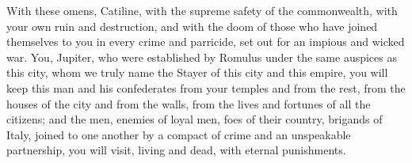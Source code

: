  With these omens, Catiline, with the supreme safety of the commonwealth, with your own ruin and destruction, and with the doom of those who have joined themselves to you in every crime and parricide, set out for an impious and wicked war. You, Jupiter, who were established by Romulus under the same auspices as this city, whom we truly name the Stayer of this city and this empire, you will keep this man and his confederates from your temples and from the rest, from the houses of the city and from the walls, from the lives and fortunes of all the citizens; and the men, enemies of loyal men, foes of their country, brigands of Italy, joined to one another by a compact of crime and an unspeakable partnership, you will visit, living and dead, with eternal punishments.
